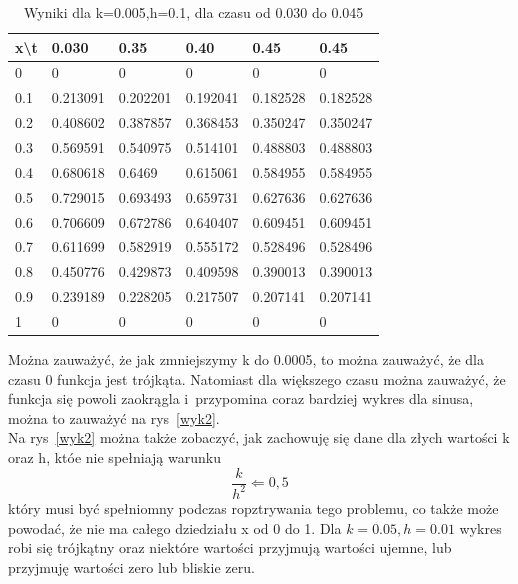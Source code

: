 \documentclass[a4paper,12pt]{article}
\begin{document}
\begin{table}[]
	\begin{tabular}{|l|l|l|l|l|l|}
		\hline
		x\textbackslash{}t & 0.030    & 0.35     & 0.40     & 0.45     & 0.45     \\ \hline
		0                  & 0        & 0        & 0        & 0        & 0        \\ \hline
		0.1                & 0.213091 & 0.202201 & 0.192041 & 0.182528 & 0.182528 \\ \hline
		0.2                & 0.408602 & 0.387857 & 0.368453 & 0.350247 & 0.350247 \\ \hline
		0.3                & 0.569591 & 0.540975 & 0.514101 & 0.488803 & 0.488803 \\ \hline
		0.4                & 0.680618 & 0.6469   & 0.615061 & 0.584955 & 0.584955 \\ \hline
		0.5                & 0.729015 & 0.693493 & 0.659731 & 0.627636 & 0.627636 \\ \hline
		0.6                & 0.706609 & 0.672786 & 0.640407 & 0.609451 & 0.609451 \\ \hline
		0.7                & 0.611699 & 0.582919 & 0.555172 & 0.528496 & 0.528496 \\ \hline
		0.8                & 0.450776 & 0.429873 & 0.409598 & 0.390013 & 0.390013 \\ \hline
		0.9                & 0.239189 & 0.228205 & 0.217507 & 0.207141 & 0.207141 \\ \hline
		1                  & 0        & 0        & 0        & 0        & 0        \\ \hline
	\end{tabular}
		\caption{Wyniki dla k=0.005,h=0.1, dla czasu od 0.030 do 0.045}
	\label{tab2}
\end{table}
Można zauważyć, że jak zmniejszymy k do 0.0005, to można zauważyć, że dla czasu 0 funkcja jest trójkąta. Natomiast dla większego czasu można zauważyć, że funkcja się powoli zaokrągla i~przypomina coraz bardziej wykres dla sinusa, można to zauważyć na rys~\ref{wyk2}. \\
Na rys~\ref{wyk2} można także zobaczyć, jak zachowuję się dane dla złych wartości k oraz h, któe nie spełniają warunku \begin{equation*}
    \frac{k}{h^2}\Leftarrow 0,5
\end{equation*}
który musi być spełniomny podczas ropztrywania tego problemu, co także może powodać, że nie ma całego dziedziału x od 0 do 1.  
Dla $k = 0.05, h = 0.01$ wykres robi się trójkątny oraz niektóre wartości przyjmują wartości ujemne, lub przyjmuję wartości zero lub bliskie zeru. 
\end{document}
